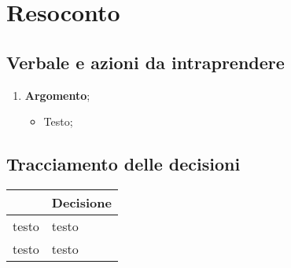 \section{Resoconto}
\subsection{Verbale e azioni da intraprendere}

\begin{enumerate}
	\item \textbf{Argomento};
	\begin{itemize}
		\item Testo;
	\end{itemize}
\end{enumerate}

\pagebreak

\subsection{Tracciamento delle decisioni}

\begin{table}[H]
	\centering
	\renewcommand{\arraystretch}{1.8}
	\begin{tabular}{c | p{10cm}}
		\rowcolor[HTML]{125E28}
		\multicolumn{1}{c}{\color[HTML]{FFFFFF} \textbf{ID}} &
		\multicolumn{1}{c}{\color[HTML]{FFFFFF} \textbf{Decisione}} \\
		\hline
		testo & testo \\ \hline
		testo & testo \\ 
	\end{tabular}
\end{table}